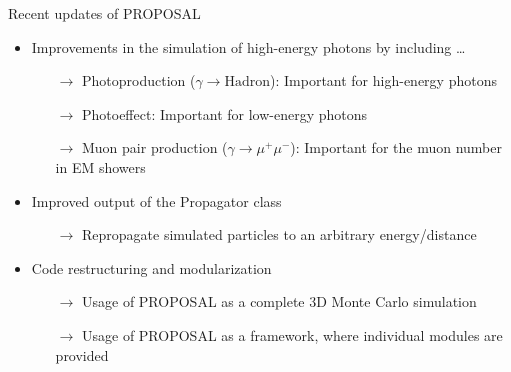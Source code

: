 \documentclass[t]{beamer}
\newlength{\itemseparation}
\begin{document}
\begin{columns}[onlytextwidth]
\begin{column}{0.45\textwidth}
\begin{block}[equal height group=F]{Recent updates of PROPOSAL}
\begin{figure}
\begin{tikzpicture}[scale=2.5, every node/.style={scale=1.0}]
            \end{tikzpicture}
        \end{figure} 
        \begin{itemize}
          \setlength\itemsep{\itemseparation}
          \item Improvements in the simulation of high-energy photons by including \dots
          \begin{itemize}
            \setlength\itemsep{\itemseparation}
            \item[$\rightarrow$] Photoproduction ($\gamma \rightarrow \text{Hadron}$): Important for high-energy photons
            \item[$\rightarrow$] Photoeffect: Important for low-energy photons
            \item[$\rightarrow$] Muon pair production ($\gamma \rightarrow \mu^+ \mu^-$): Important for the muon number in EM showers
          \end{itemize}
          \item Improved output of the Propagator class
          \begin{itemize}
            \setlength\itemsep{\itemseparation}
            \item[$\rightarrow$] Repropagate simulated particles to an arbitrary energy/distance
          \end{itemize}
          \item Code restructuring and modularization
          \begin{itemize}
            \setlength\itemsep{\itemseparation}
            \item[$\rightarrow$] Usage of PROPOSAL as a complete 3D Monte Carlo simulation
            \item[$\rightarrow$] Usage of PROPOSAL as a framework, where individual modules are provided
          \end{itemize}
        \end{itemize}
      \end{block}%
    \end{column}%
  \end{columns}%
\end{document}
